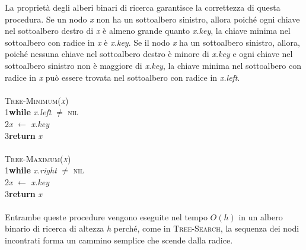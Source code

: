 \documentclass[10pt, a4paper]{report}
\newcommand\firsttab[1][0.5cm]{\hspace*{#1}}
\newcommand\secondtab[1][1cm]{\hspace*{#1}}
\begin{document}
La proprietà degli alberi binari di ricerca garantisce la correttezza di questa procedura. Se un nodo \textit{x} non ha un sottoalbero sinistro, allora poiché ogni chiave nel sottoalbero destro di \textit{x} è almeno grande quanto \textit{x.key}, la chiave minima nel sottoalbero con radice in \textit{x} è \textit{x.key}. Se il nodo \textit{x} ha un sottoalbero sinistro, allora, poiché nessuna chiave nel sottoalbero destro è minore di \textit{x.key} e ogni chiave nel sottoalbero sinistro non è maggiore di \textit{x.key}, la chiave minima nel sottoalbero con radice in \textit{x} può essere trovata nel sottoalbero con radice in \textit{x.left}.\\\\
\textsc{Tree-Minimum(\textit{x})}\\
1\firsttab\textbf{while} \textit{x.left} $\not=$ \textsc{nil}\\
2\secondtab \textit{x} $\leftarrow$ \textit{x.key}\\
3\firsttab\textbf{return} \textit{x}\\\\
\textsc{Tree-Maximum(\textit{x})}\\
1\firsttab\textbf{while} \textit{x.right} $\not=$ \textsc{nil}\\
2\secondtab \textit{x} $\leftarrow$ \textit{x.key}\\
3\firsttab\textbf{return} \textit{x}\\\\
Entrambe queste procedure vengono eseguite nel tempo $O(h)$ in un albero binario di ricerca di altezza \textit{h} perché, come in \textsc{Tree-Search}, la sequenza dei nodi incontrati forma un cammino semplice che scende dalla radice.
\end{document}
